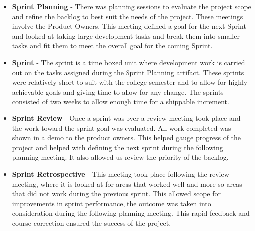 \begin{itemize}
    \item \textbf{Sprint Planning} - There was planning sessions to evaluate the project scope and refine the backlog to best suit the needs of the project. These meetings involve the Product Owners. This meeting defined a goal for the next Sprint and looked at taking large development tasks and break them into smaller tasks and fit them to meet the overall goal for the coming Sprint.
    \item \textbf{Sprint} - The sprint is a time boxed unit where development work is carried out on the tasks assigned during the Sprint Planning artifact. These sprints were relatively short to suit with the college semester and to allow for highly achievable goals and giving time to allow for any change. The sprints consisted of two weeks to allow enough time for a shippable increment.
    \item \textbf{Sprint Review} - Once a sprint was over a review meeting took place and the work toward the sprint goal was evaluated. All work completed was shown in a demo to the product owners. This helped gauge progress of the project and helped with defining the next sprint during the following planning meeting. It also allowed us review the priority of the backlog.
    \item \textbf{Sprint Retrospective} - This meeting took place following the review meeting, where it is looked at for areas that worked well and more so areas that did not work during the previous sprint. This allowed scope for improvements in sprint performance, the outcome was taken into consideration during the following planning meeting. This rapid feedback and course correction ensured the success of the project.
\end{itemize}
\clearpage
